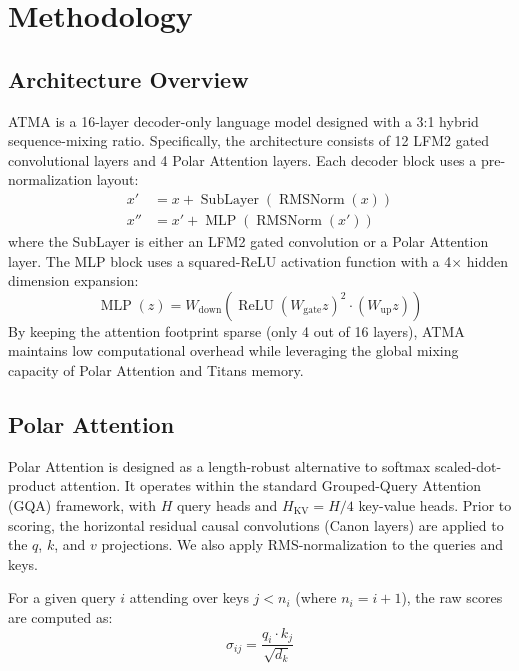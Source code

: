 \documentclass{article} %
\begin{document}
\section{Methodology}

\subsection{Architecture Overview}
ATMA is a 16-layer decoder-only language model designed with a 3:1 hybrid sequence-mixing ratio. Specifically, the architecture consists of 12 LFM2 gated convolutional layers and 4 Polar Attention layers. Each decoder block uses a pre-normalization layout:
\begin{align}
    x' &= x + \operatorname{SubLayer}(\operatorname{RMSNorm}(x)) \\
    x'' &= x' + \operatorname{MLP}(\operatorname{RMSNorm}(x'))
\end{align}
where the SubLayer is either an LFM2 gated convolution or a Polar Attention layer. The MLP block uses a squared-ReLU activation function with a 4$\times$ hidden dimension expansion:
\begin{equation}
    \operatorname{MLP}(z) = W_{\text{down}}\left( \operatorname{ReLU}(W_{\text{gate}} z)^2 \cdot (W_{\text{up}} z) \right)
\end{equation}
By keeping the attention footprint sparse (only 4 out of 16 layers), ATMA maintains low computational overhead while leveraging the global mixing capacity of Polar Attention and Titans memory.

\subsection{Polar Attention}
Polar Attention is designed as a length-robust alternative to softmax scaled-dot-product attention. It operates within the standard Grouped-Query Attention (GQA) framework, with $H$ query heads and $H_{\text{KV}} = H / 4$ key-value heads. Prior to scoring, the horizontal residual causal convolutions (Canon layers) are applied to the $q$, $k$, and $v$ projections. We also apply RMS-normalization to the queries and keys.

For a given query $i$ attending over keys $j < n_i$ (where $n_i = i + 1$), the raw scores are computed as:
\begin{equation}
    \sigma_{ij} = \frac{q_i \cdot k_j}{\sqrt{d_k}}
\end{equation}
\end{document}

